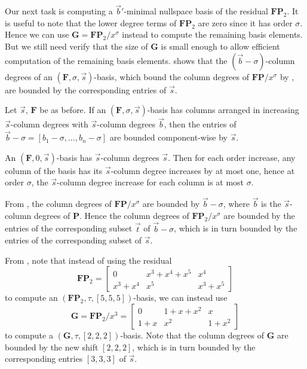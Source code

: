 Our next task is computing a $\vec{b}'$-minimal nullspace basis of
the residual $\mathbf{F}\mathbf{P}_{2}$. It is useful to note that
the lower degree terms of $\mathbf{F}\mathbf{P}_{2}$ are zero since
it has order $\sigma$. Hence we can use $\mathbf{G}=\mathbf{F}\mathbf{P}_{2}/x^{\sigma}$
instead to compute the remaining basis elements. But we still need
verify that the size of $\mathbf{G}$ is small enough to allow efficient
computation of the remaining basis elements. 
shows that the $\left(\vec{b}-\sigma\right)$-column degrees of an
$(\mathbf{F},\sigma,\vec{s})$-basis, which bound the column degrees
of $\mathbf{F}\mathbf{P}/x^{\sigma}$ by ,
are bounded by the corresponding entries of $\vec{s}$.
\begin{lem}
\label{lem:boundOnShiftedDegrees}Let $\vec{s}$, $\mathbf{F}$ be
as before. If an $(\mathbf{F},\sigma,\vec{s})$-basis has columns
arranged in increasing $\vec{s}$-column degrees with $\vec{s}$-column
degrees $\vec{b}$, then the entries of $\vec{b}-\sigma=\left[b_{1}-\sigma,\dots,b_{n}-\sigma\right]$
are bounded component-wise by $\vec{s}$.\end{lem}
\begin{pf}
An $(\mathbf{F},0,\vec{s})$-basis has $\vec{s}$-column degrees $\vec{s}$.
Then for each order increase, any column of the basis has its $\vec{s}$-column
degree increases by at most one, hence at order $\sigma$, the $\vec{s}$-column
degree increase for each column is at most $\sigma$.
\end{pf}
From , the column degrees of $\mathbf{F}\mathbf{P}/x^{\sigma}$
are bounded by $\vec{b}-\sigma$, where $\vec{b}$ is the $\vec{s}$-column
degrees of $\mathbf{P}$. Hence the column degrees of $\mathbf{F}\mathbf{P}_{2}/x^{\sigma}$
are bounded by the entries of the corresponding subset $\vec{t}$
of $\vec{b}-\sigma$, which is in turn bounded by the entries of the
corresponding subset of $\vec{s}$. 
\begin{exmp}
\label{exm:reducingDegree}From ,
note that instead of using the residual 
\[
\mathbf{F}\mathbf{P}_{2}=\left[\begin{array}{ccc}
0 & x^{3}+x^{4}+x^{5} & x^{4}\\
x^{3}+x^{4} & x^{5} & x^{3}+x^{5}
\end{array}\right]
\]
to compute an $\left(\mathbf{F}\mathbf{P}_{2},\tau,[5,5,5]\right)$-basis,
we can instead use 
\[
\mathbf{G}=\mathbf{F}\mathbf{P}_{2}/x^{3}=\left[\begin{array}{ccc}
0 & 1+x+x^{2} & x\\
1+x & x^{2} & 1+x^{2}
\end{array}\right]
\]
 to compute a $\left(\mathbf{G},\tau,[2,2,2]\right)$-basis. Note
that the column degrees of $\mathbf{G}$ are bounded by the new shift
$\left[2,2,2\right]$, which is in turn bounded by the corresponding
entries $\left[3,3,3\right]$ of $\vec{s}$.
\end{exmp}
